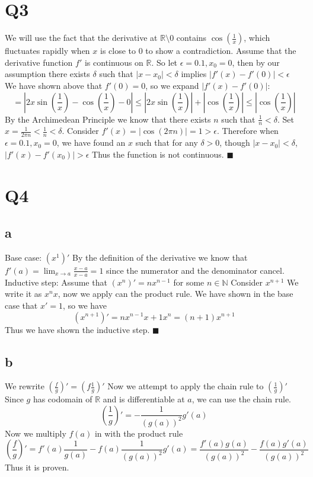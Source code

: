 \documentclass[12pt]{article}
\newcommand{\N}{\mathbb{N}}
\newcommand{\R}{\mathbb{R}}
\begin{document}
\section{Q3}
We will use the fact that the derivative at $\R \setminus 0$ contains $\cos(\frac{1}{x})$, which fluctuates rapidly when $x$ is close to 0 to show a contradiction.
\newline
Assume that the derivative function $f'$ is continuous on $\R$. So let $\epsilon = 0.1, x_0=0$, then by our assumption there exists $\delta$ such that $|x-x_0|<\delta$ implies $|f'(x)-f'(0)|<\epsilon$
\newline
We have shown above that $f'(0)=0$, so we expand $|f'(x)-f'(0)|$:
$$=|2x\sin(\frac{1}{x})-\cos(\frac{1}{x})-0| \leq |2x\sin(\frac{1}{x})|+|\cos(\frac{1}{x})| \leq |\cos(\frac{1}{x})|$$
\newline
By the Archimedean Principle we know that there exists $n$ such that $\frac{1}{n}<\delta$. Set $x = \frac{1}{2\pi n} <\frac{1}{n}<\delta$. Consider $f'(x) = |\cos(2\pi n)| = 1 > \epsilon$.
\newline
Therefore when $\epsilon=0.1, x_0=0$, we have found an $x$ such that for any $\delta > 0$, though $|x-x_0|<\delta$, $|f'(x)-f'(x_0)|>\epsilon$
\newline
Thus the function is not continuous.
$\blacksquare$
\newpage


\section{Q4}

\subsection{a}
Base case:
\newline
$(x^1)'$ By the definition of the derivative we know that $f'(a)=\lim_{x \to a} \frac{x-a}{x-a} = 1$ since the numerator and the denominator cancel.
\newline
Inductive step:
\newline
Assume that $(x^n)' = nx^{n-1}$ for some $n \in \N$ Consider $x^{n+1}$
\newline
We write it as $x^nx$, now we apply can the product rule. We have shown in the base case that $x'=1$, so we have
$$(x^{n+1})' = nx^{n-1}x + 1x^{n} = (n+1)x^{n+1}$$
Thus we have shown the inductive step. $\blacksquare$


\subsection{b}
We rewrite $(\frac{f}{g})' = (f\frac{1}{g})'$ Now we attempt to apply the chain rule to $(\frac{1}{g})'$
\newline
Since $g$ has codomain of $\R$ and is differentiable at $a$, we can use the chain rule.
$$(\frac{1}{g})' = -\frac{1}{(g(a))^2}g'(a)$$
Now we multiply $f(a)$ in with the product rule
$$(\frac{f}{g})' = f'(a)\frac{1}{g(a)}-f(a)\frac{1}{(g(a))^2}g'(a)
= \frac{f'(a)g(a)}{(g(a))^2}-\frac{f(a)g'(a)}{(g(a))^2}$$
Thus it is proven.
\newpage
\end{document}
